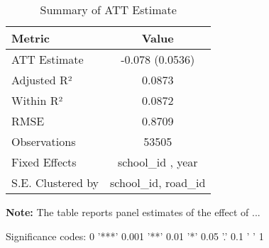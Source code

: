 \begin{table}[H]
\centering
\caption{Summary of ATT Estimate}
\label{tab:SA_inse_0p}
 \begin{center}
 \begin{tabular}{lc}
 \toprule
Metric & Value \\
\midrule
ATT Estimate & -0.078 (0.0536) \\
\hline 
 Adjusted R² & 0.0873 \\
Within R² & 0.0872 \\
RMSE & 0.8709 \\
Observations & 53505 \\
\hline 
 Fixed Effects & school_id ,  year \\
S.E. Clustered by & school_id, road_id \\
\bottomrule
\end{tabular}
 \end{center}\begin{tablenotes}
\small
\item \textbf{Note:} The table reports panel estimates of the effect of ...
\item Significance codes: 0 '***' 0.001 '**' 0.01 '*' 0.05 '.' 0.1 ' ' 1
\end{tablenotes}
\end{table}